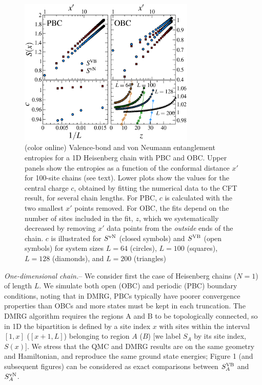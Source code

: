 \documentclass[prl,aps,twocolumn,floatfix,amsmath,amssymb,superscriptaddress,tightenlines]{revtex4}
\begin{document}
\begin{figure} {
\includegraphics[width=3.3in]{4-panelFIG1.eps} \caption{(color online) Valence-bond
and von Neumann entanglement entropies for a 1D Heisenberg chain with PBC and OBC. Upper panels show the entropies as a
function of the conformal distance $x'$ for 100-site chains (see text).
Lower plots show the values for the central charge $c$, obtained by
fitting the numerical data to the CFT result, for several chain lengths.
For PBC, $c$ is calculated with the two smallest $x'$ points removed.
For OBC, the fits depend on the number of sites included in the fit, $z$,
which we
systematically decreased by
removing $x'$ data points from the {\it outside} ends of the chain.
$c$ is illustrated for $S^{\rm vN}$ (closed symbols) and $S^{\rm VB}$ (open
symbols) for system sizes $L=64$ (circles), $L=100$ (squares), $L=128$
(diamonds), and $L=200$ (triangles) \label{1D}}} \end{figure}

{\it One-dimensional chain.}-- We consider first the case of Heisenberg
chains ($N=1$) of length $L$. We simulate both open (OBC) and periodic (PBC) boundary conditions, noting that in DMRG, PBCs typically
have poorer convergence properties than OBCs and more states must be kept
in each truncation.  The DMRG algorithm requires the regions A and B to
be topologically connected, so in 1D the bipartition is defined by a site
index $x$ with sites within the interval $[1,x]$ ($[x+1,L]$) belonging to
region $A$ ($B$) [we label $S_A$ by its site index, $S(x)$].
We stress that the QMC and DMRG results are on the same geometry and
Hamiltonian, and reproduce the same ground state energies; Figure 1 (and subsequent figures) can be considered as exact comparisons between $S^{\rm VB}_A$ and $S^{ \rm vN}_A$.
\end{document}
